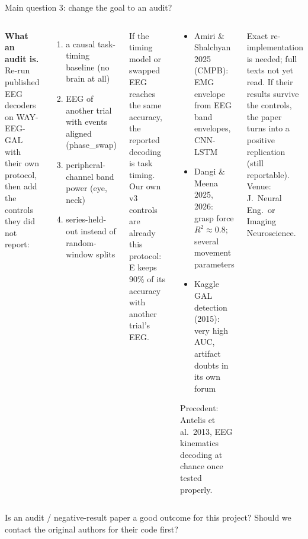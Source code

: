 \documentclass[aspectratio=169,10pt]{beamer}
\newcommand{\Verify}[1]{\begin{tcolorbox}[askbox,title={Check with the supervisor}]#1\end{tcolorbox}}
\begin{document}
\begin{frame}{Main question 3: change the goal to an audit?}
  \begin{columns}[T]
    {\footnotesize\textbf{What an audit is.} Re-run published EEG decoders on WAY-EEG-GAL with their own protocol, then add the
    controls they did not report:\par}
    \begin{enumerate}\scriptsize
      \item a causal task-timing baseline (no brain at all)
      \item EEG of another trial with events aligned (phase\_swap)
      \item peripheral-channel band power (eye, neck)
      \item series-held-out instead of random-window splits
    \end{enumerate}
    {\scriptsize If the timing model or swapped EEG reaches the same accuracy, the reported decoding is task timing.
    Our own v3 controls are already this protocol: E keeps 90\% of its accuracy with another trial's EEG.\par}
    \begin{tcolorbox}[notebox,title={Targets on this dataset (no timing control in their abstracts)}]
      \scriptsize
      \begin{itemize}
        \item Amiri \& Shalchyan 2025 (CMPB): EMG envelope from EEG band envelopes, CNN-LSTM
        \item Dangi \& Meena 2025, 2026: grasp force $R^2\approx0.8$; several movement parameters
        \item Kaggle GAL detection (2015): very high AUC, artifact doubts in its own forum
      \end{itemize}
      Precedent: Antelis et al.\ 2013, EEG kinematics decoding at chance once tested properly.
    \end{tcolorbox}
    \begin{tcolorbox}[notebox,title={Risks}]
      \scriptsize Exact re-implementation is needed; full texts not yet read. If their results survive the controls,
      the paper turns into a positive replication (still reportable). Venue: J.\ Neural Eng.\ or Imaging Neuroscience.
    \end{tcolorbox}
  \end{columns}
  \Verify{\scriptsize Is an audit / negative-result paper a good outcome for this project? Should we contact the original authors for their code first?}
\end{frame}
\end{document}
